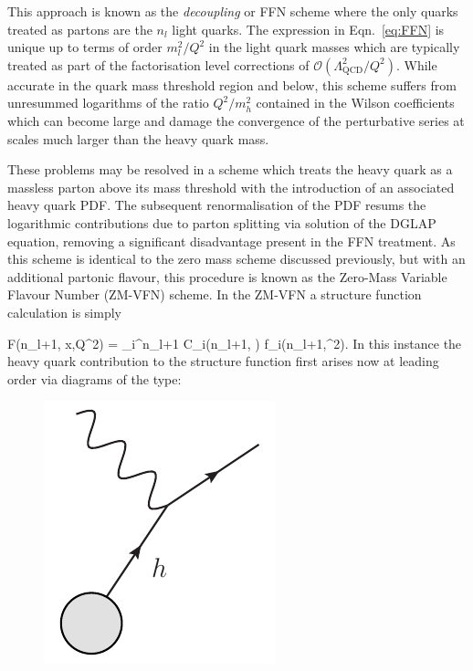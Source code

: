 This approach is known as the \emph{decoupling} or FFN scheme where the only quarks treated as partons are the $n_l$ light quarks. The expression in Eqn.~\ref{eq:FFN} is unique up to terms of order $m_l^2/Q^2$ in the light quark masses which are typically treated as part of the factorisation level corrections of $\mathcal{O}(\Lambda^2_{\mathrm{QCD}}/Q^2)$. While accurate in the quark mass threshold region and below, this scheme suffers from unresummed logarithms of the ratio $Q^2/m_h^2$ contained in the Wilson coefficients which can become large and damage the convergence of the perturbative series at scales much larger than the heavy quark mass.

These problems may be resolved in a scheme which treats the heavy quark as a massless parton above its mass threshold with the introduction of an associated heavy quark PDF. The subsequent renormalisation of the PDF resums the logarithmic contributions due to parton splitting via solution of the DGLAP equation, removing a significant disadvantage present in the FFN treatment. As this scheme is identical to the zero mass scheme discussed previously, but with an additional partonic flavour, this procedure is known as the Zero-Mass Variable Flavour Number (ZM-VFN) scheme. In the ZM-VFN a structure function calculation is simply

\be F(n_l+1, x,Q^2) = \sum_i^{n_l+1} C_i\left(n_l+1, \right) \otimes f_i(n_l+1,\mu^2). \label{eq:ZMVFN} \ee
In this instance the heavy quark contribution to the structure function first arises now at leading order via diagrams of the type:

\begin{figure}[h]
\centering
\includegraphics[scale=0.6]{2-PDFs/figs/ZMVFNS.pdf}
\end{figure}

